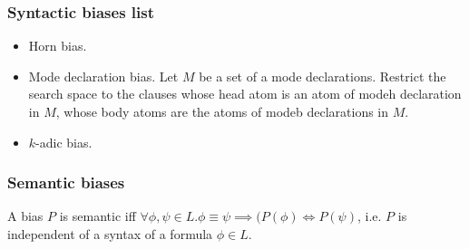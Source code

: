 \subsubsection{Syntactic biases list}
\begin{itemize}
\item Horn bias.
\item Mode declaration bias. Let $M$ be a set of a mode declarations.\cite{muggleton1995} Restrict the search space to the clauses whose head atom is an atom of modeh declaration in $M$, whose body atoms are the atoms of modeb declarations in $M$.
\item $k$-adic bias.
\end{itemize}

\subsubsection{Semantic biases}

\begin{defn}
A bias $P$ is semantic iff $\forall \phi, \psi \in L. \phi \equiv \psi \implies (P(\phi) \iff P(\psi)$, i.e. $P$ is independent of a syntax of a formula $\phi \in L$.
\end{defn}

